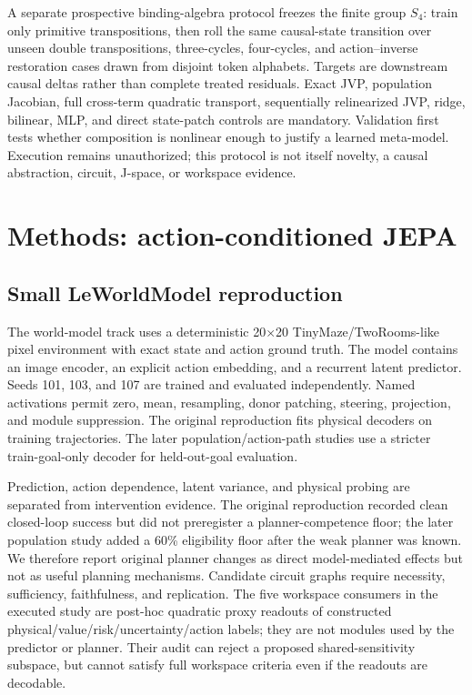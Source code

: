 \documentclass[10pt]{article}
\begin{document}
A separate prospective binding-algebra protocol freezes the finite group
$S_4$: train only primitive transpositions, then roll the same causal-state
transition over unseen double transpositions, three-cycles, four-cycles, and
action--inverse restoration cases drawn from disjoint token alphabets. Targets
are downstream causal deltas rather than complete treated residuals. Exact
JVP, population Jacobian, full cross-term quadratic transport, sequentially
relinearized JVP, ridge, bilinear, MLP, and direct state-patch controls are
mandatory. Validation first tests whether composition is nonlinear enough to
justify a learned meta-model. Execution remains unauthorized; this protocol is
not itself novelty, a causal abstraction, circuit, J-space, or workspace evidence.

\section{Methods: action-conditioned JEPA}

\subsection{Small LeWorldModel reproduction}

The world-model track uses a deterministic 20$\times$20 TinyMaze/TwoRooms-like
pixel environment with exact state and action ground truth.  The model contains
an image encoder, an explicit action embedding, and a recurrent latent
predictor.  Seeds 101, 103, and 107 are trained and evaluated independently.
Named activations permit zero, mean, resampling, donor patching, steering,
projection, and module suppression.  The original reproduction fits physical
decoders on training trajectories.  The later population/action-path studies
use a stricter train-goal-only decoder for held-out-goal evaluation.

Prediction, action dependence, latent variance, and physical probing are
separated from intervention evidence.  The original reproduction recorded
clean closed-loop success but did not preregister a planner-competence floor;
the later population study added a 60\% eligibility floor after the weak
planner was known.  We therefore report original planner changes as direct
model-mediated effects but not as useful planning mechanisms.  Candidate
circuit graphs require necessity, sufficiency, faithfulness, and replication.
The five workspace consumers in the executed study are post-hoc quadratic
proxy readouts of constructed physical/value/risk/uncertainty/action labels;
they are not modules used by the predictor or planner.  Their audit can reject
a proposed shared-sensitivity subspace, but cannot satisfy full workspace
criteria even if the readouts are decodable.
\end{document}
